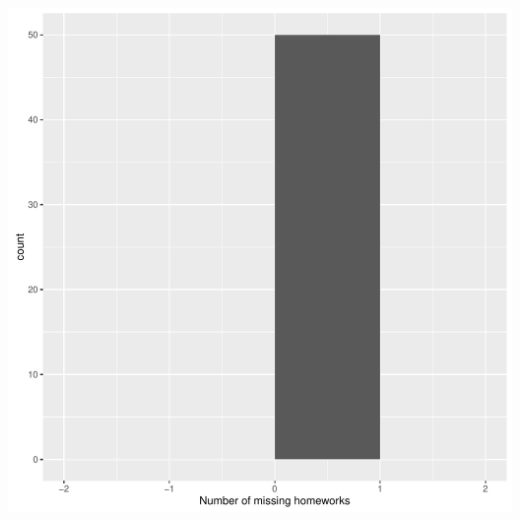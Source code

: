 \documentclass[12pt,nohyper]{tufte-handout}\usepackage[]{graphicx}\usepackage[]{color}
\makeatletter
\def\maxwidth{ %
  \ifdim\Gin@nat@width>\linewidth
    \linewidth
  \else
    \Gin@nat@width
  \fi
}
\makeatother
\begin{document}
\includegraphics[width=\maxwidth]{figure/unnamed-chunk-4-1} 
\end{document}
